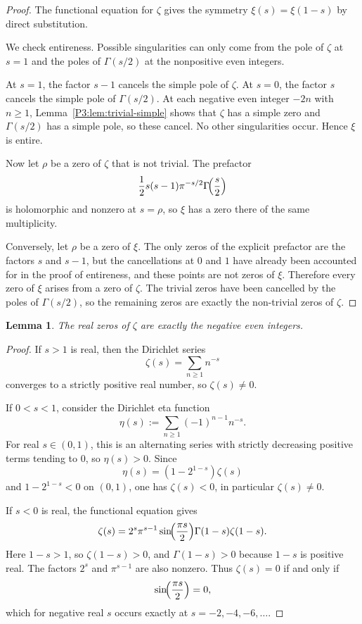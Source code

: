 \documentclass[11pt,a4paper]{article}
\numberwithin{equation}{section}
\newtheorem{lemma}[theorem]{Lemma}
\theoremstyle{definition}
\theoremstyle{remark}
\begin{document}
\begin{proof}
The functional equation for $\zeta$ gives the symmetry $\xi(s)=\xi(1-s)$ by direct substitution.

We check entireness.  Possible singularities can only come from the pole of $\zeta$ at $s=1$ and the poles of $\Gamma(s/2)$ at the nonpositive even integers.

At $s=1$, the factor $s-1$ cancels the simple pole of $\zeta$.
At $s=0$, the factor $s$ cancels the simple pole of $\Gamma(s/2)$.
At each negative even integer $-2n$ with $n\ge 1$, Lemma~\ref{P3:lem:trivial-simple} shows that $\zeta$ has a simple zero and $\Gamma(s/2)$ has a simple pole, so these cancel.  No other singularities occur.  Hence $\xi$ is entire.

Now let $\rho$ be a zero of $\zeta$ that is not trivial.  The prefactor
\[
\frac12 s(s-1)\pi^{-s/2}\Gamma\!\Bigl(\frac s2\Bigr)
\]
is holomorphic and nonzero at $s=\rho$, so $\xi$ has a zero there of the same multiplicity.

Conversely, let $\rho$ be a zero of $\xi$.  The only zeros of the explicit prefactor are the factors $s$ and $s-1$, but the cancellations at $0$ and $1$ have already been accounted for in the proof of entireness, and these points are not zeros of $\xi$.  Therefore every zero of $\xi$ arises from a zero of $\zeta$.  The trivial zeros have been cancelled by the poles of $\Gamma(s/2)$, so the remaining zeros are exactly the non-trivial zeros of $\zeta$.
\end{proof}

\begin{lemma}\label{P3:lem:real-zeros}
The real zeros of $\zeta$ are exactly the negative even integers.
\end{lemma}

\begin{proof}
If $s>1$ is real, then the Dirichlet series
\[
\zeta(s)=\sum_{n\ge 1} n^{-s}
\]
converges to a strictly positive real number, so $\zeta(s)\ne 0$.

If $0<s<1$, consider the Dirichlet eta function
\[
\eta(s):=\sum_{n\ge1} (-1)^{n-1} n^{-s}.
\]
For real $s\in(0,1)$, this is an alternating series with strictly decreasing positive terms tending to $0$, so $\eta(s)>0$.  Since
\[
\eta(s)=(1-2^{1-s})\zeta(s)
\]
and $1-2^{1-s}<0$ on $(0,1)$, one has $\zeta(s)<0$, in particular $\zeta(s)\ne 0$.

If $s<0$ is real, the functional equation gives
\[
\zeta(s)=2^s\pi^{s-1}\sin\!\Bigl(\frac{\pi s}{2}\Bigr)\Gamma(1-s)\zeta(1-s).
\]
Here $1-s>1$, so $\zeta(1-s)>0$, and $\Gamma(1-s)>0$ because $1-s$ is positive real.  The factors $2^s$ and $\pi^{s-1}$ are also nonzero.  Thus $\zeta(s)=0$ if and only if
\[
\sin\!\Bigl(\frac{\pi s}{2}\Bigr)=0,
\]
which for negative real $s$ occurs exactly at $s=-2,-4,-6,\dots$.
\end{proof}
\end{document}
